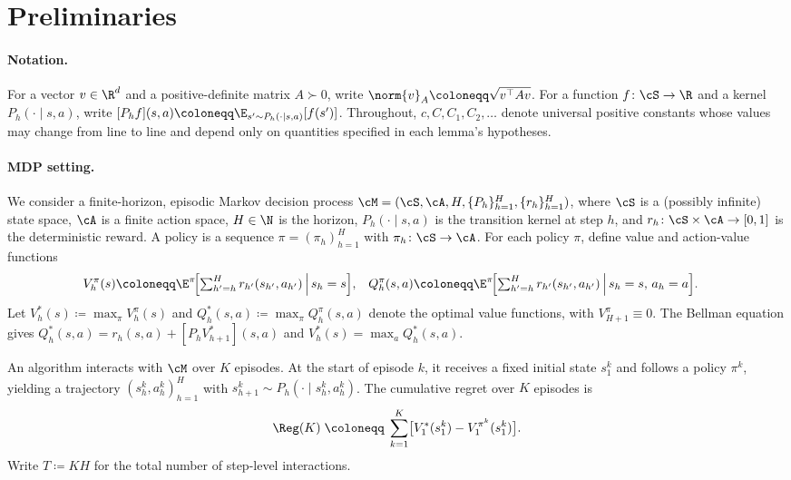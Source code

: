 \section{Preliminaries}\label{sec:prelim}

\paragraph{Notation.}
For a vector $v \in \R^d$ and a positive-definite matrix $A \succ 0$, write $\norm{v}_A \coloneqq \sqrt{v^\top A v}$. For a function $f \colon \cS \to \R$ and a kernel $P_h(\cdot \mid s, a)$, write $[P_h f](s, a) \coloneqq \E_{s' \sim P_h(\cdot \mid s, a)}[ f(s') ]$. Throughout, $c, C, C_1, C_2, \ldots$ denote universal positive constants whose values may change from line to line and depend only on quantities specified in each lemma's hypotheses.

\paragraph{MDP setting.}
We consider a finite-horizon, episodic Markov decision process $\cM = (\cS, \cA, H, \{P_h\}_{h=1}^H, \{r_h\}_{h=1}^H)$, where $\cS$ is a (possibly infinite) state space, $\cA$ is a finite action space, $H \in \N$ is the horizon, $P_h(\cdot \mid s, a)$ is the transition kernel at step $h$, and $r_h \colon \cS \times \cA \to [0, 1]$ is the deterministic reward. A policy is a sequence $\pi = (\pi_h)_{h=1}^H$ with $\pi_h \colon \cS \to \cA$. For each policy $\pi$, define value and action-value functions
\begin{align*}
V_h^\pi(s)
&\coloneqq \E^\pi\!\Bigl[ \textstyle\sum_{h'=h}^H r_{h'}(s_{h'}, a_{h'}) \,\Big|\, s_h = s \Bigr],
&
Q_h^\pi(s, a)
&\coloneqq \E^\pi\!\Bigl[ \textstyle\sum_{h'=h}^H r_{h'}(s_{h'}, a_{h'}) \,\Big|\, s_h = s,\, a_h = a \Bigr].
\end{align*}
Let $V_h^*(s) \coloneqq \max_\pi V_h^\pi(s)$ and $Q_h^*(s, a) \coloneqq \max_\pi Q_h^\pi(s, a)$ denote the optimal value functions, with $V_{H+1}^\pi \equiv 0$. The Bellman equation gives $Q_h^*(s, a) = r_h(s, a) + [P_h V_{h+1}^*](s, a)$ and $V_h^*(s) = \max_a Q_h^*(s, a)$.

An algorithm interacts with $\cM$ over $K$ episodes. At the start of episode $k$, it receives a fixed initial state $s_1^k$ and follows a policy $\pi^k$, yielding a trajectory $(s_h^k, a_h^k)_{h=1}^H$ with $s_{h+1}^k \sim P_h(\cdot \mid s_h^k, a_h^k)$. The cumulative regret over $K$ episodes is
\begin{align*}
\Reg(K) \;\coloneqq\; \sum_{k=1}^K \bigl[ V_1^*(s_1^k) - V_1^{\pi^k}(s_1^k) \bigr].
\end{align*}
Write $T \coloneqq K H$ for the total number of step-level interactions.

